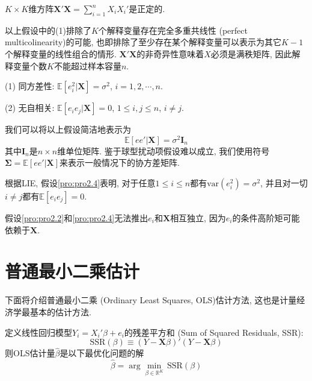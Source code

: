 \documentclass[cn, 12pt, math=mtpro2, bibstyle=apa, blue, twocol]{elegantbook}
\newcommand{\R}{\mathbb{R}}
\newcommand{\E}{\mathbb{E}}
\newcommand{\var}{\text{var}}
\newcommand{\X}{\mathbold{X}}
\begin{document}
\begin{proposition}[非奇异性]\label{pro:pro2.3}
$K\times K$维方阵$\X'\X=\sum_{i=1}^{n}X_iX_i'$是正定的.
\end{proposition}
以上假设中的(1)排除了$K$个解释变量存在完全多重共线性 (perfect multicolinearity)的可能, 也即排除了至少存在某个解释变量可以表示为其它$K-1$个解释变量的线性组合的情形. $\X'\X$的非奇异性意味着$X$必须是满秩矩阵, 因此解释变量个数$K$不能超过样本容量$n$.

\begin{proposition}[球型扰动项]\label{pro:pro2.4}
(1) 同方差性: $\E[e_i^2|\X]=\sigma^2$, $i=1,2,\cdots,n$.

(2) 无自相关: $\E[e_ie_j|\X]=0$, $1\leq i,j\leq n$, $i\neq j$.
\end{proposition}
我们可以将以上假设简洁地表示为
$$\E[ee'|\X]=\sigma^2\mathbold{I}_n$$
其中$\mathbold{I}_n$是$n\times n$维单位矩阵. 鉴于球型扰动项假设难以成立, 我们使用符号$\mathbold{\Sigma}=\E[ee'|\X]$来表示一般情况下的协方差矩阵.

根据LIE, 假设\ref{pro:pro2.4}表明, 对于任意$1\leq i\leq n$都有$\var(e_i^2)=\sigma^2$, 并且对一切$i\neq j$都有$\E[e_ie_j]=0$.

\begin{remark}
假设\ref{pro:pro2.2}和\ref{pro:pro2.4}无法推出$e_i$和$\X$相互独立, 因为$e_i$的条件高阶矩可能依赖于$\X$.
\end{remark}
\section{普通最小二乘估计}
下面将介绍普通最小二乘 (Ordinary Least Squares, OLS)估计方法, 这也是计量经济学最基本的估计方法.

\begin{definition}
  定义线性回归模型$Y_i=X_i'\beta+e_i$的残差平方和 (Sum of Squared Residuals, SSR):
  $$\text{SSR}(\beta)\equiv (Y-\X\beta)'(Y-\X\beta)$$
  则OLS估计量$\hat{\beta}$是以下最优化问题的解
  $$\hat{\beta}=\arg\min_{\beta\in\R^K}\,\text{SSR}(\beta)$$
\end{definition}
\end{document}

